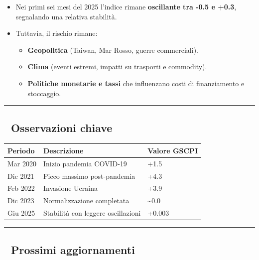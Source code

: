 \documentclass[
  11pt,
  letterpaper,
  DIV=11,
  numbers=noendperiod]{scrartcl}
\providecommand{\tightlist}{%
  \setlength{\itemsep}{0pt}\setlength{\parskip}{0pt}}
\begin{document}
\begin{itemize}
\item
  Nei primi sei mesi del 2025 l'indice rimane \textbf{oscillante tra
  -0.5 e +0.3}, segnalando una relativa stabilità.
\item
  Tuttavia, il rischio rimane:

  \begin{itemize}
  \tightlist
  \item
    \textbf{Geopolitica} (Taiwan, Mar Rosso, guerre commerciali).
  \item
    \textbf{Clima} (eventi estremi, impatti su trasporti e commodity).
  \item
    \textbf{Politiche monetarie e tassi} che influenzano costi di
    finanziamento e stoccaggio.
  \end{itemize}
\end{itemize}

\begin{center}\rule{0.5\linewidth}{0.5pt}\end{center}

\subsection{\texorpdfstring{📌 \textbf{Osservazioni
chiave}}{📌 Osservazioni chiave}}\label{osservazioni-chiave}

\begin{longtable}[]{@{}lll@{}}
\toprule\noalign{}
Periodo & Descrizione & Valore GSCPI \\
\midrule\noalign{}
\endhead
\bottomrule\noalign{}
\endlastfoot
Mar 2020 & Inizio pandemia COVID-19 & +1.5 \\
Dic 2021 & Picco massimo post-pandemia & +4.3 \\
Feb 2022 & Invasione Ucraina & +3.9 \\
Dic 2023 & Normalizzazione completata & \textasciitilde0.0 \\
Giu 2025 & Stabilità con leggere oscillazioni & +0.003 \\
\end{longtable}

\begin{center}\rule{0.5\linewidth}{0.5pt}\end{center}

\subsection{\texorpdfstring{🔧 \textbf{Prossimi
aggiornamenti}}{🔧 Prossimi aggiornamenti}}\label{prossimi-aggiornamenti}
\end{document}
